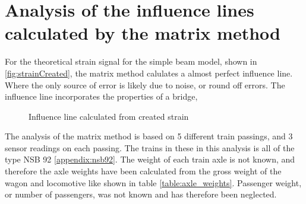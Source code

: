 \section{Analysis of the influence lines calculated by the matrix method}
For the theoretical strain signal for the simple beam model, shown in \ref{fig:strainCreated}, the matrix method calulates a almost perfect influence line. Where the only source of error is likely due to noise, or round off errors. The influence line incorporates the properties of a bridge,
\begin{figure}[H]
	\begin{adjustbox}{center}
		
	\end{adjustbox}
	\caption{Influence line calculated from created strain}
	\label{fig:inflCreated}
\end{figure}
The analysis of the matrix method is based on 5 different train passings, and 3 sensor readings on each passing. The trains in these in this analysis is all of the type NSB 92 \ref{appendix:nsb92}. The weight of each train axle is not known, and therefore the axle weights have been calculated from the gross weight of the wagon and locomotive like shown in table \ref{table:axle_weights}. Passenger weight, or number of passengers, was not known and has therefore been neglected.

